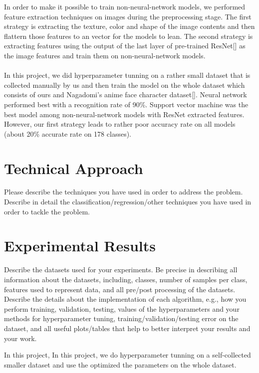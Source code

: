 \documentclass[11.5pt]{article}
\begin{document}
In order to make it possible to train non-neural-network models, we performed feature extraction techniques on images during the preprocessing stage. The first strategy is extracting the texture, color and shape of the image contents and then flattern those features to an vector for the models to lean. The second strategy is extracting features using the output of the last layer of pre-trained ResNet[] as the image features and train them on non-neural-network models.\\ \\
In this project, we did hyperparameter tunning on a rather small dataset that is collected manually by us and then train the model on the whole dataset which consists of ours and Nagadomi’s anime face character dataset[]. Neural network performed best with a recognition rate of 90\%. Support vector machine was the best model among non-neural-network models with ResNet extracted features. However, our first strategy leads to rather poor accuracy rate on all models (about 20\% accurate rate on 178 classes). 


\section{Technical Approach}
Please describe the techniques you have used in order to address the problem. Describe in detail the classification/regression/other techniques you have used in order to tackle the problem.

\section{Experimental Results}
Describe the datasets used for your experiments. Be precise in describing all information about the datasets, including, classes, number of samples per class, features used to represent data, and all pre/post processing of the datasets.\\
Describe the details about the implementation of each algorithm, e.g., how you perform training, validation, testing, values of the hyperparameters and your methods for hyperparameter tuning, training/validation/testing error on the dataset, and all useful plots/tables that help to better interpret your results and your work.

In this project, 
In this project, we do hyperparameter tunning on a self-collected smaller dataset and use the optimized the parameters on the whole dataset. 
\end{document}

